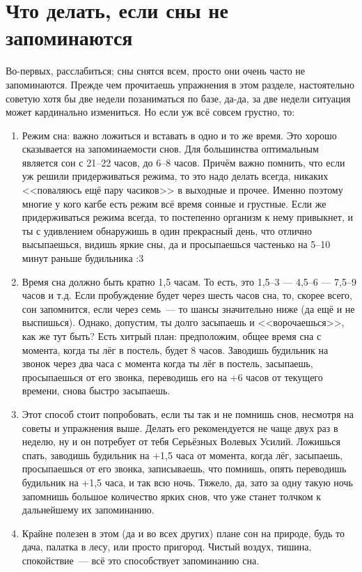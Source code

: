 \documentclass[a5paper,12pt,twoside]{memoir}
\begin{document}
\chapter{Что делать, если сны не запоминаются}
Во-первых, расслабиться; сны снятся всем, просто они очень часто не запоминаются. Прежде чем прочитаешь упражнения в этом разделе, настоятельно советую хотя бы две недели позаниматься по базе, да-да, за две недели ситуация может кардинально измениться. Но если уж всё совсем грустно, то:
\begin{enumerate}
\item Режим сна: важно ложиться и вставать в одно и то же время. Это хорошо сказывается на запоминаемости снов. Для большинства оптимальным является сон с 21--22 часов, до 6--8 часов.
Причём важно помнить, что если уж решили придерживаться режима, то это надо делать всегда, никаких <<поваляюсь ещё пару часиков>> в выходные и прочее. Именно поэтому многие у кого кагбе есть режим всё время сонные и грустные. Если же придерживаться режима всегда, то постепенно организм к нему привыкнет, и ты с удивлением обнаружишь в один прекрасный день, что отлично высыпаешься, видишь яркие сны, да и просыпаешься частенько на 5--10 минут раньше будильника :3
\item Время сна должно быть кратно 1,5 часам. То есть, это 1,5--3 --- 4,5--6 --- 7,5--9 часов и т.д. Если пробуждение будет через шесть часов сна, то, скорее всего, сон запомнится, если через семь~--- то шансы значительно ниже (да ещё и не выспишься). Однако, допустим, ты долго засыпаешь и <<ворочаешься>>, как же тут быть? Есть хитрый план: предположим, общее время сна с момента, когда ты лёг в постель, будет 8 часов. Заводишь будильник на звонок через два часа с момента когда ты лёг в постель, засыпаешь, просыпаешься от его звонка, переводишь его на +6 часов от текущего времени, снова быстро засыпаешь.
\item Этот способ стоит попробовать, если ты так и не помнишь снов, несмотря на советы и упражнения выше. Делать его рекомендуется не чаще двух раз в неделю, ну и он потребует от тебя Серьёзных Волевых Усилий. Ложишься спать, заводишь будильник на +1,5 часа от момента, когда лёг, засыпаешь, просыпаешься от его звонка, записываешь, что помнишь, опять переводишь будильник на +1,5 часа, и так всю ночь. Тяжело, да, зато за одну такую ночь запомнишь большое количество ярких снов, что уже станет толчком к дальнейшему их запоминанию. 
\item Крайне полезен в этом  (да и во всех других) плане сон на природе, будь то дача, палатка в лесу, или просто пригород. Чистый воздух, тишина, спокойствие~--- всё это способствует запоминанию сна.
 

\end{enumerate}
\end{document}
